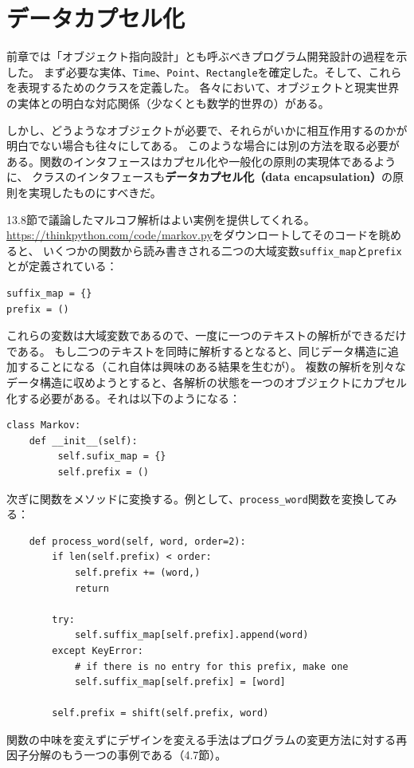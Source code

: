 \documentclass[a4j,12pt,makeidx]{jbook}
\begin{document}
\section{データカプセル化}
前章では「オブジェクト指向設計」とも呼ぶべきプログラム開発設計の過程を示した。
まず必要な実体、{\tt Time}、{\tt Point}、{\tt Rectangle}を確定した。そして、これらを表現するためのクラスを定義した。
各々において、オブジェクトと現実世界の実体との明白な対応関係（少なくとも数学的世界の）がある。\par
しかし、どうようなオブジェクトが必要で、それらがいかに相互作用するのかが明白でない場合も往々にしてある。
このような場合には別の方法を取る必要がある。関数のインタフェースはカプセル化や一般化の原則の実現体であるように、
クラスのインタフェースも{\bf データカプセル化（data encapsulation）}の原則を実現したものにすべきだ。\par
13.8節で議論したマルコフ解析はよい実例を提供してくれる。 \\
\url{https://thinkpython.com/code/markov.py}をダウンロートしてそのコードを眺めると、
いくつかの関数から読み書きされる二つの大域変数{\tt suffix\_map}と{\tt prefix}とが定義されている：
\begin{verbatim}
suffix_map = {}
prefix = ()
\end{verbatim}
これらの変数は大域変数であるので、一度に一つのテキストの解析ができるだけである。
もし二つのテキストを同時に解析するとなると、同じデータ構造に追加することになる（これ自体は興味のある結果を生むが）。
複数の解析を別々なデータ構造に収めようとすると、各解析の状態を一つのオブジェクトにカプセル化する必要がある。それは以下のようになる：
\begin{verbatim}
class Markov:
    def __init__(self):
         self.sufix_map = {}
         self.prefix = ()
\end{verbatim}
次ぎに関数をメソッドに変換する。例として、{\tt process\_word}関数を変換してみる：
\begin{verbatim}
    def process_word(self, word, order=2):
        if len(self.prefix) < order:
            self.prefix += (word,)
            return

        try:
            self.suffix_map[self.prefix].append(word)
        except KeyError:
            # if there is no entry for this prefix, make one
            self.suffix_map[self.prefix] = [word]

        self.prefix = shift(self.prefix, word)        
\end{verbatim}
関数の中味を変えずにデザインを変える手法はプログラムの変更方法に対する再因子分解のもう一つの事例である（4.7節）。\par
\end{document}

